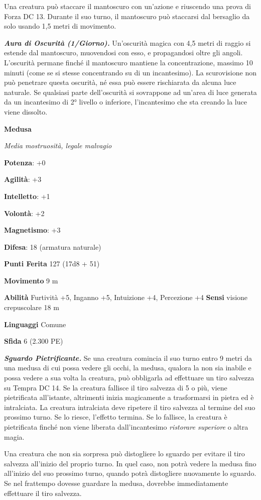 \begin{multicols}{2}
Una creatura può staccare il mantoscuro con un'azione e riuscendo una
prova di Forza DC 13. Durante il suo turno, il mantoscuro può staccarsi
dal bersaglio da solo usando 1,5 metri di movimento.

\emph{\textbf{Aura di Oscurità (1/Giorno).}} Un'oscurità magica con 4,5
metri di raggio si estende dal mantoscuro, muovendosi con esso, e
propagandosi oltre gli angoli. L'oscurità permane finché il mantoscuro
mantiene la concentrazione, massimo 10 minuti (come se si stesse
concentrando su di un incantesimo). La scurovisione non può penetrare
questa oscurità, né essa può essere rischiarata da alcuna luce naturale.
Se qualsiasi parte dell'oscurità si sovrappone ad un'area di luce
generata da un incantesimo di 2° livello o inferiore, l'incantesimo che
sta creando la luce viene dissolto.

\textbf{Medusa}

\emph{Media mostruosità, legale malvagio}

\textbf{Potenza}: +0

\textbf{Agilità}: +3

\textbf{Intelletto}: +1

\textbf{Volontà}: +2

\textbf{Magnetismo}: +3

\textbf{Difesa}: 18 (armatura naturale)

\textbf{Punti Ferita} 127 (17d8 + 51)

\textbf{Movimento} 9 m

\textbf{Abilità} Furtività +5, Inganno +5, Intuizione +4, Percezione +4
\textbf{Sensi} visione crepuscolare 18 m

\textbf{Linguaggi} Comune

\textbf{Sfida} 6 (2.300 PE)

\emph{\textbf{Sguardo Pietrificante.}} Se una creatura comincia il suo
turno entro 9 metri da una medusa di cui possa vedere gli occhi, la
medusa, qualora la non sia inabile e possa vedere a sua volta la
creatura, può obbligarla ad effettuare un tiro salvezza su Tempra
DC 14. Se la creatura fallisce il tiro salvezza di 5 o più, viene
pietrificata all'istante, altrimenti inizia magicamente a trasformarsi
in pietra ed è intralciata. La creatura intralciata deve ripetere il
tiro salvezza al termine del suo prossimo turno. Se lo riesce, l'effetto
termina. Se lo fallisce, la creatura è pietrificata finché non viene
liberata dall'incantesimo \emph{ristorare superiore} o altra magia.

Una creatura che non sia sorpresa può distogliere lo sguardo per evitare
il tiro salvezza all'inizio del proprio turno. In quel caso, non potrà
vedere la medusa fino all'inizio del suo prossimo turno, quando potrà
distogliere nuovamente lo sguardo. Se nel frattempo dovesse guardare la
medusa, dovrebbe immediatamente effettuare il tiro salvezza.


\end{multicols}
